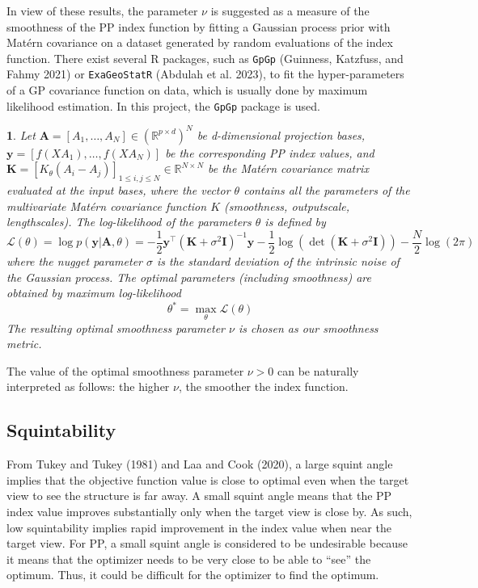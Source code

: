 \documentclass[
  12pt,
]{interact}
\theoremstyle{plain}
\newtheorem{defn}{\protect\definitionname}
\providecommand{\definitionname}{Definition}
\begin{document}
In view of these results, the parameter \(\nu\) is suggested as a
measure of the smoothness of the PP index function by fitting a Gaussian
process prior with Matérn covariance on a dataset generated by random
evaluations of the index function. There exist several R packages, such
as \texttt{GpGp} (Guinness, Katzfuss, and Fahmy 2021) or
\texttt{ExaGeoStatR} (Abdulah et al. 2023), to fit the hyper-parameters
of a GP covariance function on data, which is usually done by maximum
likelihood estimation. In this project, the \texttt{GpGp} package is
used.

\begin{defn}
Let $\mathbf{A}=[A_1, \ldots, A_N] \in (\mathbb{R}^{p \times d})^N$ be d-dimensional projection bases, $\mathbf{y}=[f(XA_1),\ldots,f(XA_N)]$ be the corresponding PP index values, and $\mathbf{K}=[K_\theta(A_{i}-A_{j})]_{1\leq i,j\leq N}\in\mathbb{R}^{N\times N}$ be the Matérn covariance matrix evaluated at the input bases, where the vector $\theta$ contains all the parameters of the multivariate Matérn covariance function $K$ (smoothness, outputscale, lengthscales). The log-likelihood of the parameters $\theta$ is defined by 
\begin{equation}
\mathcal{L}(\theta)=\log p(\mathbf{y}\left|\mathbf{A},\theta\right.)=-\frac{1}{2}\mathbf{y}^{\top}(\mathbf{K}+\sigma^{2}\mathbf{I})^{-1}\mathbf{y}-\frac{1}{2}\mathrm{\log}(\det(\mathbf{K}+\sigma^{2}\mathbf{I}))-\frac{N}{2}\log(2\pi)\, \label{eq:gp_log_likelihood}
\end{equation}
where the nugget parameter $\sigma$ is the standard deviation of the intrinsic noise of the Gaussian process.
The optimal parameters (including smoothness) are obtained by maximum log-likelihood
\begin{equation}
\theta^* = \underset{\theta}{\max}\mathcal{L}(\theta)
\end{equation}
The resulting optimal smoothness parameter $\nu$ is chosen as our smoothness metric.
\end{defn}

The value of the optimal smoothness parameter \(\nu>0\) can be naturally
interpreted as follows: the higher \(\nu\), the smoother the index
function.

\subsection{Squintability}\label{sec-squintability}

From Tukey and Tukey (1981) and Laa and Cook (2020), a large squint
angle implies that the objective function value is close to optimal even
when the target view to see the structure is far away. A small squint
angle means that the PP index value improves substantially only when the
target view is close by. As such, low squintability implies rapid
improvement in the index value when near the target view. For PP, a
small squint angle is considered to be undesirable because it means that
the optimizer needs to be very close to be able to ``see'' the optimum.
Thus, it could be difficult for the optimizer to find the optimum.
\end{document}
